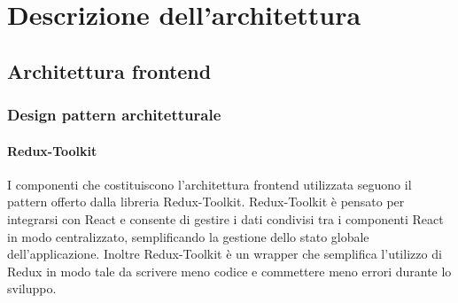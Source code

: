\section{Descrizione dell'architettura}
\subsection{Architettura frontend}
\subsubsection{Design pattern architetturale}

\paragraph{Redux-Toolkit}
I componenti che costituiscono l'architettura frontend utilizzata seguono il
pattern offerto dalla libreria Redux-Toolkit. Redux-Toolkit è pensato per
integrarsi con React e consente di gestire i dati condivisi tra i componenti React in modo centralizzato,
semplificando la gestione dello stato globale dell'applicazione. Inoltre
Redux-Toolkit è un wrapper che semplifica l'utilizzo di Redux in modo tale da
scrivere meno codice e commettere meno errori durante lo sviluppo.

